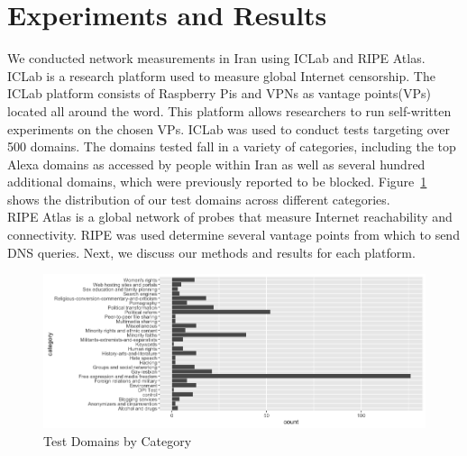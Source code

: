 \section{Experiments and Results}\label{sec:experimentsandresults}
We conducted network measurements in Iran using ICLab and RIPE Atlas.\\
ICLab is a research platform used to measure global Internet censorship. The ICLab platform consists of Raspberry Pis and VPNs as vantage points(VPs) located all around the word. This  platform allows researchers to run self-written experiments on the chosen VPs. ICLab was used to conduct tests targeting over 500 domains. The domains tested fall in a variety of categories, including the top  Alexa domains as accessed by people within Iran as well as several hundred additional domains, which were previously reported to be blocked. Figure~\ref{fig:websitelist} shows the distribution of our test domains across different categories.\\
RIPE Atlas is a global network of probes that measure Internet reachability and connectivity. RIPE was used determine several vantage points from which to send DNS queries. Next, we discuss our methods and results for each platform.
\begin{figure}
  \centerline{\includegraphics[width=.9\textwidth,keepaspectratio]{pictures/WebsiteList.png}}
  \caption{Test Domains by Category}
  \label{fig:websitelist}
\end{figure}


